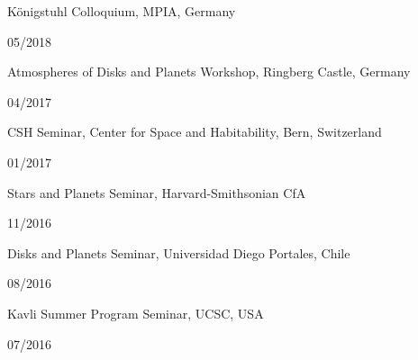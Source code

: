 \documentclass[11pt, a4paper]{article} %
\begin{document}
\begin{minipage}[t]{0.7\textwidth}
\begin{flushleft}%
  \setlength{\leftskip}{0.2cm}%
Königstuhl Colloquium, MPIA, Germany
\end{flushleft}
\end{minipage}
\begin{minipage}[t]{0.3\textwidth}
\hfill 05/2018
\end{minipage}

\begin{minipage}[t]{0.7\textwidth}
\begin{flushleft}%
  \setlength{\leftskip}{0.2cm}%
Atmospheres of Disks and Planets Workshop, Ringberg Castle, Germany
\end{flushleft}
\end{minipage}
\begin{minipage}[t]{0.3\textwidth}
\hfill 04/2017
\end{minipage}

\begin{minipage}[t]{0.7\textwidth}
\begin{flushleft}%
  \setlength{\leftskip}{0.2cm}%
CSH Seminar, Center for Space and Habitability, Bern, Switzerland
\end{flushleft}
\end{minipage}
\begin{minipage}[t]{0.3\textwidth}
\hfill 01/2017
\end{minipage}

\begin{minipage}[t]{0.7\textwidth}
\begin{flushleft}%
  \setlength{\leftskip}{0.2cm}%
Stars and Planets Seminar, Harvard-Smithsonian CfA
\end{flushleft}
\end{minipage}
\begin{minipage}[t]{0.3\textwidth}
\hfill 11/2016
\end{minipage}


\begin{minipage}[t]{0.7\textwidth}
\begin{flushleft}%
  \setlength{\leftskip}{0.2cm}%
Disks and Planets Seminar, Universidad Diego Portales, Chile
\end{flushleft}
\end{minipage}
\begin{minipage}[t]{0.3\textwidth}
\hfill 08/2016
\end{minipage}

\begin{minipage}[t]{0.7\textwidth}
\begin{flushleft}%
  \setlength{\leftskip}{0.2cm}%
Kavli Summer Program Seminar, UCSC, USA
\end{flushleft}
\end{minipage}
\begin{minipage}[t]{0.3\textwidth}
\hfill 07/2016
\end{minipage}
\end{document}
